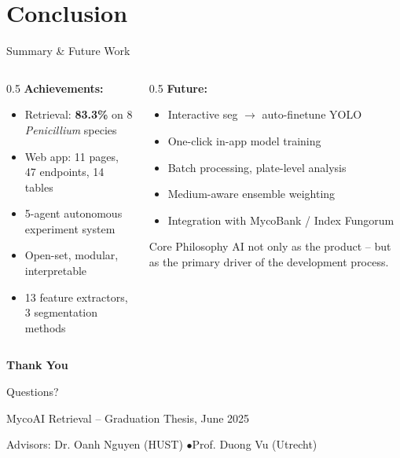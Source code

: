 \documentclass[aspectratio=169]{beamer}
\begin{document}
\section{Conclusion}

\begin{frame}{Summary \& Future Work}
  \begin{columns}[T]
    \begin{column}{0.5\textwidth}
      \textbf{Achievements:}
      \begin{itemize}
        \item Retrieval: \textbf{83.3\%} on 8 \textit{Penicillium} species
        \item Web app: 11 pages, 47 endpoints, 14 tables
        \item 5-agent autonomous experiment system
        \item Open-set, modular, interpretable
        \item 13 feature extractors, 3 segmentation methods
      \end{itemize}
    \end{column}
    \begin{column}{0.5\textwidth}
      \textbf{Future:}
      \begin{itemize}
        \item Interactive seg $\rightarrow$ auto-finetune YOLO
        \item One-click in-app model training
        \item Batch processing, plate-level analysis
        \item Medium-aware ensemble weighting
        \item Integration with MycoBank / Index Fungorum
      \end{itemize}
      \begin{block}{Core Philosophy}
        AI not only as the product -- but as the primary driver of the development process.
      \end{block}
    \end{column}
  \end{columns}
\end{frame}

\begin{frame}[plain]
  \vfill
  \centering
  {\Huge\textcolor{mycoDark}{\textbf{Thank You}}}

  \vspace{1em}
  {\Large Questions?}

  \vspace{2em}
  {\small MycoAI Retrieval -- Graduation Thesis, June 2025}

  \vspace{1em}
  {\footnotesize Advisors: Dr. Oanh Nguyen (HUST) \quad$\bullet$\quad Prof. Duong Vu (Utrecht)}
  \vfill
\end{frame}
\end{document}
